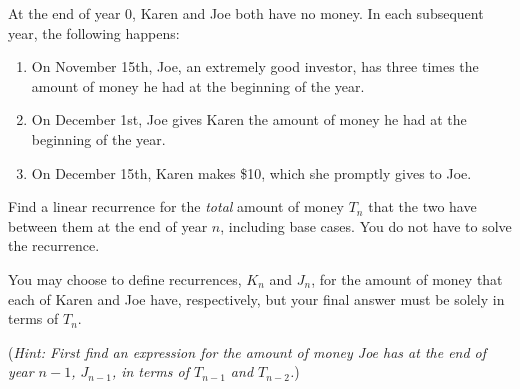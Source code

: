 \documentclass[12pt,oneside]{article}
\begin{document}
%
%
%
\newpage
\begin{problem}{10}
At the end of year 0, Karen and Joe both have no money. In each subsequent year, the following happens:
\begin{enumerate}
\item On November 15th, Joe, an extremely good investor, has three times the amount of money he had at the beginning of the year.
\item On December 1st, Joe gives Karen the amount of money he had at the beginning of the year.
\item On December 15th, Karen makes \$10, which she promptly gives to Joe.
\end{enumerate}

Find a linear recurrence for the \textit{total} amount of money $T_n$ that the two have between them at the end of year $n$, including base cases. You do not have to solve the recurrence.

\vspace{0.3in}
You may choose to define recurrences, $K_n$ and $J_n$, for the amount of money that each of Karen and Joe have, respectively, but your final answer must be solely in terms of $T_n$.

(\textit{Hint: First find an expression for the amount of money Joe has at the end of year $n - 1$, $J_{n-1}$, in terms of $T_{n - 1}$ and $T_{n - 2}$.})

\end{problem}
\end{document}
